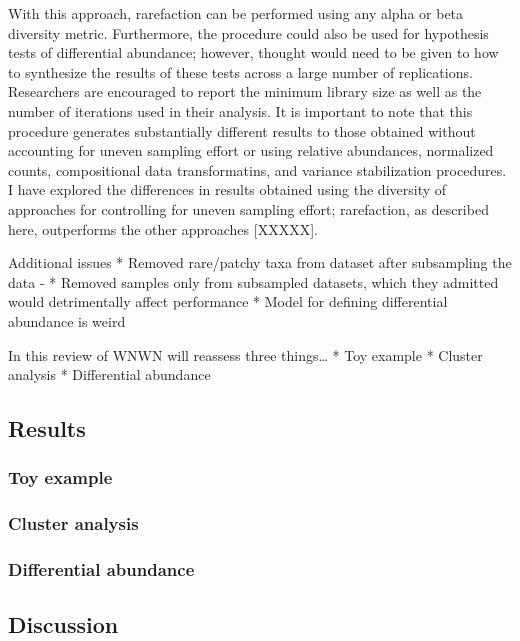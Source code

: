 \documentclass[
]{article}
\begin{document}
With this approach, rarefaction can be performed using any alpha or beta
diversity metric. Furthermore, the procedure could also be used for
hypothesis tests of differential abundance; however, thought would need
to be given to how to synthesize the results of these tests across a
large number of replications. Researchers are encouraged to report the
minimum library size as well as the number of iterations used in their
analysis. It is important to note that this procedure generates
substantially different results to those obtained without accounting for
uneven sampling effort or using relative abundances, normalized counts,
compositional data transformatins, and variance stabilization
procedures. I have explored the differences in results obtained using
the diversity of approaches for controlling for uneven sampling effort;
rarefaction, as described here, outperforms the other approaches
{[}XXXXX{]}.

Additional issues * Removed rare/patchy taxa from dataset after
subsampling the data - * Removed samples only from subsampled datasets,
which they admitted would detrimentally affect performance * Model for
defining differential abundance is weird

In this review of WNWN will reassess three things\ldots{} * Toy example
* Cluster analysis * Differential abundance

\hypertarget{results}{%
\subsection{Results}\label{results}}

\hypertarget{toy-example}{%
\subsubsection{Toy example}\label{toy-example}}

\hypertarget{cluster-analysis}{%
\subsubsection{Cluster analysis}\label{cluster-analysis}}

\hypertarget{differential-abundance}{%
\subsubsection{Differential abundance}\label{differential-abundance}}

\hypertarget{discussion}{%
\subsection{Discussion}\label{discussion}}
\end{document}
